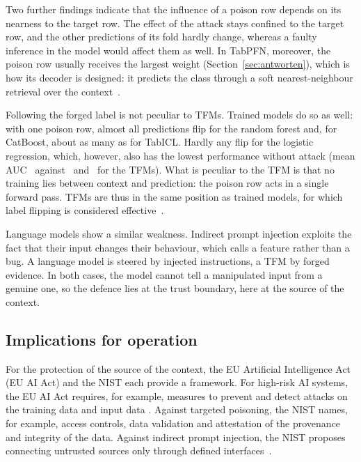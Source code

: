 \documentclass[pdflatex,sn-mathphys-num]{sn-jnl}
\begin{document}
Two further findings indicate that the influence of a poison row depends
on its nearness to the target row. The effect of the attack stays confined to the target row, and
the other predictions of its fold hardly change, whereas a faulty
inference in the model would affect them as well. In TabPFN, moreover,
the poison row usually receives the largest weight
(Section~\ref{sec:antworten}), which is how its decoder is designed: it
predicts the class through a soft nearest-neighbour retrieval over the
context~\citep{grinsztajn2026}.

Following the forged label is not peculiar to TFMs. Trained models do so
as well: with one poison row, almost all predictions flip for the random
forest and, for CatBoost, about as many as for TabICL. Hardly any flip
for the logistic regression, which, however, also has the lowest
performance without attack (mean AUC \zLRauc\ against \zICLauc\ and
\zPFNauc\ for the TFMs). What is peculiar to the TFM is that no training
lies between context and prediction: the poison row acts in a single
forward pass. TFMs are thus in the same position as trained models, for
which label flipping is considered effective~\citep{vassilev2025}.

Language models show a similar weakness. Indirect prompt injection
exploits the fact that their input changes their behaviour, which
\citet{schneier2024} calls a feature rather than a bug. A language model
is steered by injected instructions, a TFM by forged evidence. In both
cases, the model cannot tell a manipulated input from a genuine one, so
the defence lies at the trust boundary, here at the source of the
context.

\subsection{Implications for operation}
\label{sec:trainiert}

For the protection of the source of the context, the EU Artificial Intelligence Act (EU AI Act) and the NIST each provide
a framework. For high-risk AI systems, the EU AI Act requires, for example,
measures to prevent and detect attacks on the training data and
input data
\citep[Art.~15(5)]{euaiact2024}.
Against targeted poisoning, the NIST names, for example, access controls,
data validation and attestation of the provenance and integrity of the
data. Against indirect prompt injection, the NIST proposes connecting untrusted sources only through defined
interfaces~\citep{vassilev2025}.
\end{document}
